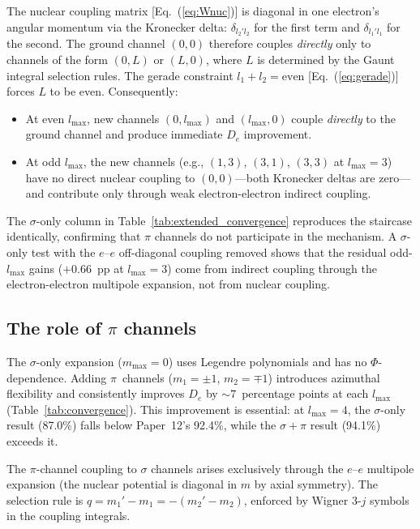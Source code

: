 \documentclass[aps,pra,twocolumn,superscriptaddress,longbibliography]{revtex4-2}
\begin{document}
The nuclear coupling matrix [Eq.~(\ref{eq:Wnuc})] is diagonal in
one electron's angular momentum via the Kronecker delta:
$\delta_{l_2' l_2}$ for the first term and $\delta_{l_1' l_1}$
for the second.  The ground channel $(0,0)$ therefore couples
\emph{directly} only to channels of the form $(0,L)$ or $(L,0)$,
where $L$ is determined by the Gaunt integral selection rules.
The gerade constraint $l_1 + l_2 = \text{even}$
[Eq.~(\ref{eq:gerade})] forces $L$ to be even.  Consequently:
\begin{itemize}
  \item At even $l_{\max}$, new channels $(0, l_{\max})$ and
    $(l_{\max}, 0)$ couple \emph{directly} to the ground channel
    and produce immediate $D_e$ improvement.
  \item At odd $l_{\max}$, the new channels
    (e.g., $(1,3)$, $(3,1)$, $(3,3)$ at $l_{\max} = 3$) have no
    direct nuclear coupling to $(0,0)$---both Kronecker deltas are
    zero---and contribute only through weak electron-electron
    indirect coupling.
\end{itemize}

The $\sigma$-only column in Table~\ref{tab:extended_convergence}
reproduces the staircase identically, confirming that $\pi$
channels do not participate in the mechanism.  A $\sigma$-only
test with the $e$--$e$ off-diagonal coupling removed shows that
the residual odd-$l_{\max}$ gains ($+0.66$~pp at $l_{\max} = 3$)
come from indirect coupling through the electron-electron
multipole expansion, not from nuclear coupling.

\subsection{The role of \texorpdfstring{$\pi$}{pi} channels}

The $\sigma$-only expansion ($m_{\max}=0$) uses Legendre polynomials
and has no $\Phi$-dependence.  Adding $\pi$~channels
($m_1 = \pm 1$, $m_2 = \mp 1$) introduces azimuthal flexibility
and consistently improves $D_e$ by ${\sim}7$~percentage points
at each $l_{\max}$ (Table~\ref{tab:convergence}).
This improvement is essential: at $l_{\max}=4$, the $\sigma$-only
result (87.0\%) falls below Paper~12's 92.4\%, while the
$\sigma{+}\pi$ result (94.1\%) exceeds it.

The $\pi$-channel coupling to $\sigma$ channels arises exclusively
through the $e$--$e$ multipole expansion (the nuclear potential is
diagonal in $m$ by axial symmetry).  The selection rule is
$q = m_1' - m_1 = -(m_2' - m_2)$, enforced by Wigner 3-$j$ symbols
in the coupling integrals.
\end{document}
